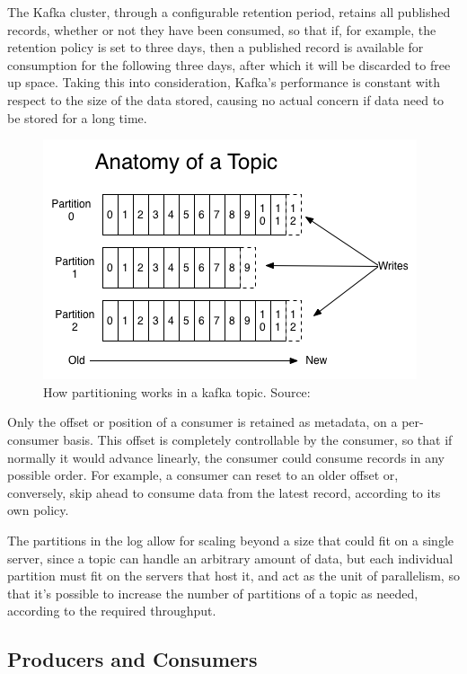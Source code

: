 The Kafka cluster, through a configurable retention period, retains all published records, whether or not they have been consumed, so that if, for example, the retention policy is set to three days, then a published record is available for consumption for the following three days, after which it will be discarded to free up space. Taking this into consideration, Kafka's performance is constant with respect to the size of the data stored, causing no actual concern if data need to be stored for a long time.


\begin{figure}[h]
    \centering
    \includegraphics[width=0.7\linewidth]{Figures/log_anatomy}
    \caption[How partition works in a kafka topic]{How partitioning works in a kafka topic. Source: \cite{kafka_doc}}
    \label{fig:loganatomy}
\end{figure}

Only the offset or position of a consumer is retained as metadata, on a per-consumer basis. This offset is completely controllable by the consumer, so that if normally it would advance linearly, the consumer could consume records in any possible order. For example, a consumer can reset to an older offset or, conversely, skip ahead to consume data from the latest record, according to its own policy.

The partitions in the log allow for scaling beyond a size that could fit on a single server, since a topic can handle an arbitrary amount of data, but each individual partition must fit on the servers that host it, and act as the unit of parallelism, so that it's possible to increase the number of partitions of a topic as needed, according to the required throughput.

\subsection{Producers and Consumers}

